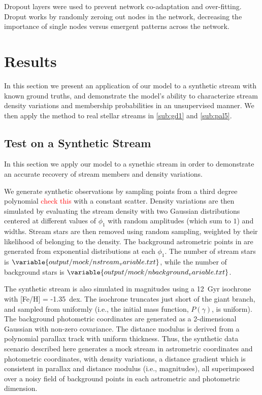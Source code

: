 \documentclass[twocolumn]{aastex631}
\newcommand{\TODO}[1]{{\textcolor{red}{#1}}}
\newcommand{\JN}[1]{\TODO{#1}}
\begin{document}
        Dropout layers were used to prevent network co-adaptation and over-fitting. Droput works by randomly zeroing out nodes in the network, decreasing the importance of single nodes versus emergent patterns across the  network.

        

\section{Results} \label{sec:results}

    In this section we present an application of our model to a synthetic stream with known ground truths, and demonstrate the model's ability to characterize stream density variations and membership probabilities in an unsupervised manner. We then apply the method to real stellar streams in \autoref{sub:gd1} and \autoref{sub:pal5}.

    \subsection{Test on a Synthetic Stream} \label{sub:mock_data}
    
        In this section we apply our model to a synethic stream in order to demonstrate an accurate recovery of stream members and density variations.
    
        We generate synthetic observations by sampling points from a third degree polynomial \JN{check this} with a constant scatter. Density variations are then simulated by evaluating the stream density with two Gaussian distributions centered at different values of $\phi_1$ with random amplitudes (which sum to $1$) and widths. Stream stars are then removed using random sampling, weighted by their likelihood of belonging to the density. The background astrometric  points in are generated from exponential distributions at each $\phi_1$. The number of stream stars is $\variable{output/mock/nstream_variable.txt}$, while the number of background stars is $\variable{output/mock/nbackground_variable.txt}$.
    
        The synthetic stream is also simulated in magnitudes using a 12~Gyr isochrone with [Fe/H] = -1.35~dex. The isochrone truncates just short of the giant branch, and sampled from uniformly (i.e., the initial mass function, $P(\gamma)$, is uniform). The background photometric coordinates are generated as a 2-dimensional Gaussian with non-zero covariance. The distance modulus is derived from a polynomial parallax track with uniform thickness. Thus, the synthetic data scenario described here generates a mock stream in astrometric coordinates and photometric coordinates, with density variations, a distance gradient which is consistent in parallax and distance modulus (i.e., magnitudes), all superimposed over a noisy field of background points in each astrometric and photometric dimension.
    
\end{document}
